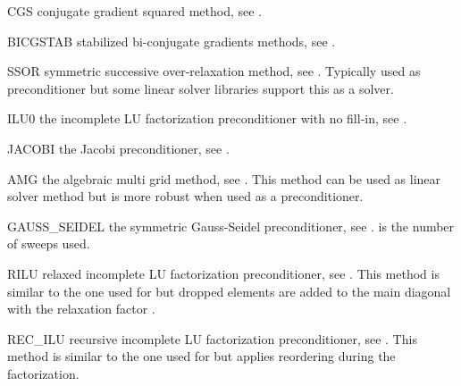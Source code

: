 \begin{memberdesc}[SolverOptions]{CGS}
conjugate gradient squared method, see .
\end{memberdesc}

\begin{memberdesc}[SolverOptions]{BICGSTAB}
stabilized bi-conjugate gradients methods, see .
\end{memberdesc}

\begin{memberdesc}[SolverOptions]{SSOR}
symmetric successive over-relaxation method, see .
Typically used as preconditioner but some linear solver libraries support
this as a solver.
\end{memberdesc}

\begin{memberdesc}[SolverOptions]{ILU0}
the incomplete LU factorization preconditioner with no fill-in, see .
\end{memberdesc}

\begin{memberdesc}[SolverOptions]{JACOBI}
the Jacobi preconditioner, see .
\end{memberdesc}

\begin{memberdesc}[SolverOptions]{AMG}
the algebraic multi grid method, see . This method can be used as
linear solver method but is more robust when used as a preconditioner.
\end{memberdesc}

\begin{memberdesc}[SolverOptions]{GAUSS_SEIDEL}
the symmetric Gauss-Seidel preconditioner, see .
 is the number of sweeps used.
\end{memberdesc}

\begin{memberdesc}[SolverOptions]{RILU}
relaxed incomplete LU factorization preconditioner, see .
This method is similar to the one used for \ILU but dropped elements are added
to the main diagonal with the relaxation factor .
\end{memberdesc}

\begin{memberdesc}[SolverOptions]{REC_ILU}
recursive incomplete LU factorization preconditioner, see .
This method is similar to the one used for \ILU but applies reordering during
the factorization.
\end{memberdesc}

